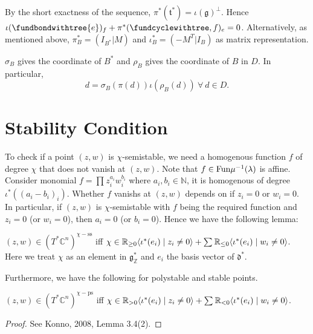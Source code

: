 \documentclass[b5paper]{article}
\newcommand{\sstab}{\mathrm{ss}}
\newcommand{\pstab}{\mathrm{ps}}
\begin{document}
\begin{remark}
  By the short exactness of the sequence, $\pi^*(\mathfrak{t}^*)=\iota(\mathfrak{g})^\perp $. Hence $\iota(\fundbondwithtree{e})_f+\pi^*(\fundcyclewithtree,f)_e=0$.
  Alternatively, as mentioned above, $\pi^*_B=(I_{B^*}|M)$ and $\iota^*_B=(-M^T|I_B)$ as matrix representation.
\end{remark}

\begin{proposition}[pps:]{}
  $\sigma_B$ gives the coordinate of $B^*$ and $\rho_B$ gives the coordinate of $B$ in $D$. In particular,
  \[
    d=\sigma_B(\pi(d))\iota(\rho_B(d))\ \forall\ d\in D.
  \]
\end{proposition}

\section{Stability Condition}

To check if a point $(z,w)$ is $\chi$-semistable, we need a homogenous function $f$ of degree $\chi$ that does not vanish at $(z,w)$. Note that $f\in \textnormal{Fun}\mu^{-1}(\lambda)$ is affine. Consider monomial $f=\prod_{}^{}z_i^{a_i}w_i^{b_i}$ where $a_i,b_i\in \mathbb{N}$, it is homogenous of degree $\iota^*((a_i-b_i)_i)$. Whether $f$ vanishs at $(z,w)$ depends on if $z_i=0$ or $w_i=0$. In particular, if $(z,w)$ is $\chi$-semistable with $f$ being the required function and $z_i=0$ (or $w_i=0$), then $a_i=0$ (or $b_i=0$). Hence we have the following lemma:

\begin{lemma}{}
  $(z,w)\in (T^*\mathbb{C}^n)^{\chi-\sstab}$  iff $\chi\in \mathbb{R}_{\geq 0}\langle \iota^{*}(e_i)\mid z_i\neq 0\rangle+\sum_{}^{}\mathbb{R}_{\leq 0}\langle \iota^{*}(e_i)\mid w_i\neq 0\rangle$. Here we treat $\chi$ as an element in $\mathfrak{g}^*_{\mathbb{Z}}$ and $e_i$ the basis vector of $\mathfrak{d}^*$.
\end{lemma}

Furthermore, we have the following for polystable and stable points.

\begin{proposition}[pps:]{}
  $(z,w)\in (T^*\mathbb{C}^n)^{\chi-\pstab}$  iff $\chi\in \mathbb{R}_{> 0}\langle \iota^{*}(e_i)\mid z_i\neq 0\rangle+\sum_{}^{}\mathbb{R}_{< 0}\langle \iota^{*}(e_i)\mid w_i\neq 0\rangle$.
  \begin{proof}
    See Konno, 2008, Lemma 3.4(2).
  \end{proof}
\end{proposition}
\end{document}
